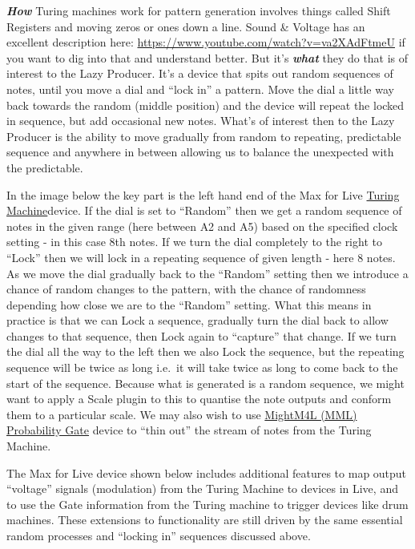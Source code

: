 \documentclass[
  12pt,
  letterpaper,
  oneside,
  open=any]{scrbook}
\begin{document}
\textbf{\emph{How}} Turing machines work for pattern generation involves
things called Shift Registers and moving zeros or ones down a line.
Sound \& Voltage has an excellent description here:
\url{https://www.youtube.com/watch?v=va2XAdFtmeU} if you want to dig
into that and understand better. But it's \textbf{\emph{what}} they do
that is of interest to the Lazy Producer. It's a device that spits out
random sequences of notes, until you move a dial and ``lock in'' a
pattern. Move the dial a little way back towards the random (middle
position) and the device will repeat the locked in sequence, but add
occasional new notes. What's of interest then to the Lazy Producer is
the ability to move gradually from random to repeating, predictable
sequence and anywhere in between allowing us to balance the unexpected
with the predictable.

In the image below the key part is the left hand end of the Max for Live
\href{https://maxforlive.com/library/device/5988/turing-machine}{Turing
Machine}device. If the dial is set to ``Random'' then we get a random
sequence of notes in the given range (here between A2 and A5) based on
the specified clock setting - in this case 8th notes. If we turn the
dial completely to the right to ``Lock'' then we will lock in a
repeating sequence of given length - here 8 notes. As we move the dial
gradually back to the ``Random'' setting then we introduce a chance of
random changes to the pattern, with the chance of randomness depending
how close we are to the ``Random'' setting. What this means in practice
is that we can Lock a sequence, gradually turn the dial back to allow
changes to that sequence, then Lock again to ``capture'' that change. If
we turn the dial all the way to the left then we also Lock the sequence,
but the repeating sequence will be twice as long i.e.~it will take twice
as long to come back to the start of the sequence. Because what is
generated is a random sequence, we might want to apply a Scale plugin to
this to quantise the note outputs and conform them to a particular
scale. We may also wish to use
\href{https://maxforlive.com/library/device/6982/mm4l-probability-gate}{MightM4L
(MML) Probability Gate} device to ``thin out'' the stream of notes from
the Turing Machine.

The Max for Live device shown below includes additional features to map
output ``voltage'' signals (modulation) from the Turing Machine to
devices in Live, and to use the Gate information from the Turing machine
to trigger devices like drum machines. These extensions to functionality
are still driven by the same essential random processes and ``locking
in'' sequences discussed above.
\end{document}
